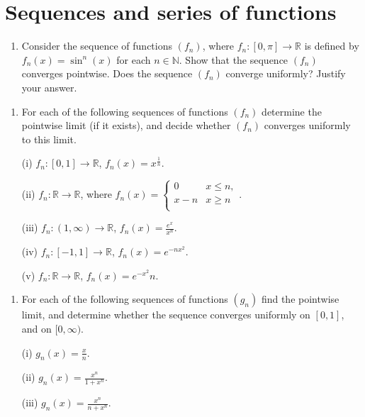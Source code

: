 \documentclass[letterpaper,10pt,english]{jupyterBook}
\begin{document}
\section{Sequences and series of functions}
\label{\detokenize{Problems:sequences-and-series-of-functions}}\label{\detokenize{Problems:ch5prob}}\label{\detokenize{Problems:id54}}\begin{enumerate}
%
\setcounter{enumi}{53}
\item {} 
\sphinxAtStartPar
Consider the sequence of functions  \((f_n)\), where \(f_n:[0,\pi ]\to \mathbb{R}\) is defined by \(f_n(x) = \sin^n (x)\) for each \(n\in\mathbb{N}\). Show that the sequence \((f_n)\) converges pointwise. Does the sequence \((f_n)\)  converge uniformly? Justify your answer.

\end{enumerate}
\label{\detokenize{Problems:id55}}\begin{enumerate}
%
\setcounter{enumi}{54}
\item {} 
\sphinxAtStartPar
For each of the following sequences of functions \((f_n)\) determine the pointwise limit (if it exists), and decide whether \((f_n)\) converges uniformly to this limit.

\sphinxAtStartPar
(i) \(f_n:[0,1]\to\mathbb{R}\), \(f_n (x) = x^{\frac{1}{n}}\).

\sphinxAtStartPar
(ii) \(f_n:\mathbb{R}\to\mathbb{R}\), where \(\displaystyle f_n (x)  = \left\{ \begin{array}{ll} 0 & x\leq n, \\ x-n & x\geq n \\ \end{array} \right.\).

\sphinxAtStartPar
(iii) \(f_n:(1,\infty)\to\mathbb{R}\), \(f_n(x) = \frac{e^x}{x^n}\).

\sphinxAtStartPar
(iv) \(f_n:[-1,1]\to\mathbb{R}\), \(f_n(x) = e^{-nx^2}\).

\sphinxAtStartPar
(v) \(f_n:\mathbb{R}\to\mathbb{R}\), \(f_n(x) = e^{-x^2}{n}\).

\end{enumerate}
\label{\detokenize{Problems:id56}}\begin{enumerate}
%
\setcounter{enumi}{55}
\item {} 
\sphinxAtStartPar
For each of the following sequences of functions \((g_n)\) find the pointwise limit, and determine whether the sequence converges uniformly on \([0,1]\), and on \([0,\infty)\).

\sphinxAtStartPar
(i) \(\displaystyle g_n(x) = \frac{x}{n}\).

\sphinxAtStartPar
(ii) \(\displaystyle g_n(x) = \frac{x^n}{1+x^n}\).

\sphinxAtStartPar
(iii) \(\displaystyle g_n (x) = \frac{x^n}{n+x^n}\).

\end{enumerate}
\end{document}
